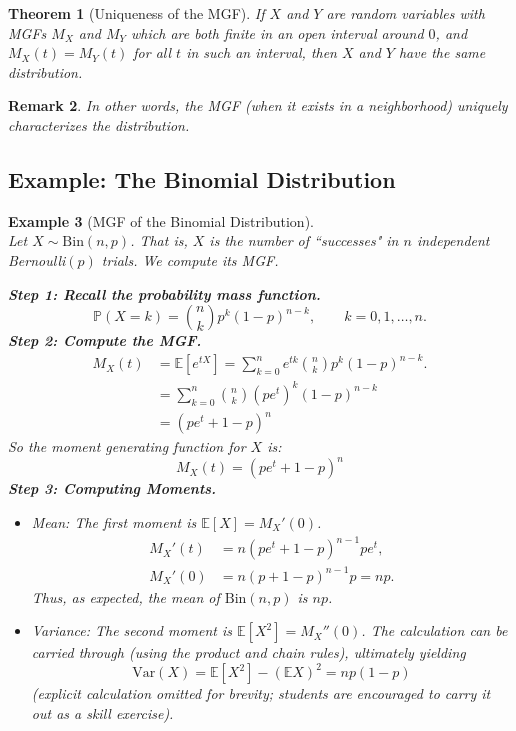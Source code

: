 \documentclass[12pt]{article}
\newtheorem{theorem}{Theorem}[section]
\newtheorem{remark}[theorem]{Remark}
\newtheorem{example}[theorem]{Example}
\begin{document}
\begin{theorem}[Uniqueness of the MGF]
    If $X$ and $Y$ are random variables with MGFs $M_X$ and $M_Y$ which are both finite in an open interval around $0$, and $M_X(t) = M_Y(t)$ for all $t$ in such an interval, then $X$ and $Y$ have the same distribution.
\end{theorem}

\begin{remark}
    In other words, the MGF (when it exists in a neighborhood) uniquely characterizes the distribution.
\end{remark}

\subsection{Example: The Binomial Distribution}
\begin{example}[MGF of the Binomial Distribution]\mbox{}\\
    Let $X \sim \mathrm{Bin}(n, p)$. That is, $X$ is the number of ``successes" in $n$ independent Bernoulli$(p)$ trials. We compute its MGF.

    \vspace{0.5em}
    \textbf{Step 1: Recall the probability mass function.}
    \[
        \mathbb{P}(X = k) = \binom{n}{k} p^k (1-p)^{n-k}, \qquad k = 0, 1, \dotsc, n.
    \]
    \textbf{Step 2: Compute the MGF.}
    \begin{align*}
        M_X(t) &= \mathbb{E}[e^{tX}] = \sum_{k=0}^n e^{t k} \binom{n}{k} p^k (1-p)^{n-k}. \\
        &= \sum_{k=0}^n \binom{n}{k} (p e^{t})^k (1-p)^{n-k} \\
        &= (p e^t + 1 - p)^n
    \end{align*}
    So the moment generating function for $X$ is:
    \[
        \boxed{M_X(t) = (p e^t + 1 - p)^n}
    \]
    \textbf{Step 3: Computing Moments.}
    \begin{itemize}
        \item \emph{Mean:} The first moment is $\mathbb{E}[X] = M_X'(0)$.
            \begin{align*}
                M_X'(t) &= n (p e^t + 1-p)^{n-1} p e^t, \\
                M_X'(0) &= n (p + 1 - p)^{n-1} p = n p.
            \end{align*}
            Thus, as expected, the mean of $\mathrm{Bin}(n,p)$ is $n p$.
        \item \emph{Variance:} The second moment is $\mathbb{E}[X^2] = M_X''(0)$. The calculation can be carried through (using the product and chain rules), ultimately yielding
            \[
                \mathrm{Var}(X) = \mathbb{E}[X^2] - (\mathbb{E} X)^2 = n p (1-p)
            \]
            (explicit calculation omitted for brevity; students are encouraged to carry it out as a skill exercise).
    \end{itemize}
\end{example}
\end{document}
